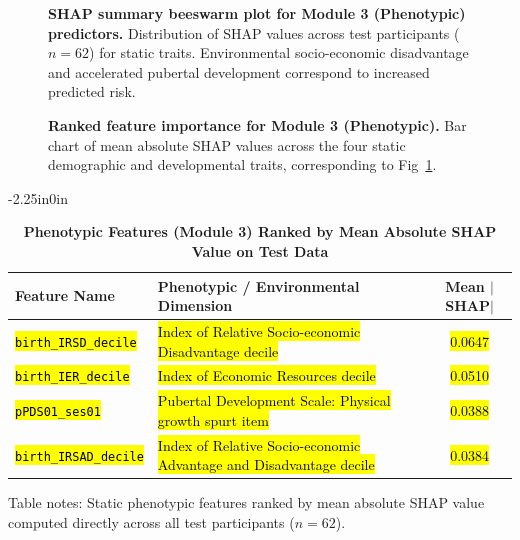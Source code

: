 \documentclass[10pt,letterpaper]{article}
\begin{document}
\begin{figure}[!h]
\caption{\textbf{SHAP summary beeswarm plot for Module 3 (Phenotypic) predictors.}
Distribution of SHAP values across test participants ($n=62$) for static traits. Environmental socio-economic disadvantage and accelerated pubertal development correspond to increased predicted risk.}
\label{fig:module3_shap_summary}
\end{figure}

\begin{figure}[!h]
\caption{\textbf{Ranked feature importance for Module 3 (Phenotypic).}
Bar chart of mean absolute SHAP values across the four static demographic and developmental traits, corresponding to Fig~\ref{fig:module3_shap_summary}.}
\label{fig:module3_bar}
\end{figure}

\begin{table}[!t]
\begin{adjustwidth}{-2.25in}{0in}
\centering
\caption{\textbf{Phenotypic Features (Module 3) Ranked by Mean Absolute SHAP Value on Test Data}}
\label{tab:module3_shap}
\footnotesize
\renewcommand{\arraystretch}{1.2}
\begin{tabular}{|l|l|c|}
\hline
\textbf{Feature Name} & \textbf{Phenotypic / Environmental Dimension} & \textbf{Mean $|$SHAP$|$} \\
\hline
\hl{\texttt{birth\_IRSD\_decile}} & \hl{Index of Relative Socio-economic Disadvantage decile} & \hl{0.0647} \\
\hline
\hl{\texttt{birth\_IER\_decile}} & \hl{Index of Economic Resources decile} & \hl{0.0510} \\
\hline
\hl{\texttt{pPDS01\_ses01}} & \hl{Pubertal Development Scale: Physical growth spurt item} & \hl{0.0388} \\
\hline
\hl{\texttt{birth\_IRSAD\_decile}} & \hl{Index of Relative Socio-economic Advantage and Disadvantage decile} & \hl{0.0384} \\
\hline
\end{tabular}
\begin{flushleft}
Table notes: Static phenotypic features ranked by mean absolute SHAP value computed directly across all test participants ($n=62$).
\end{flushleft}
\end{adjustwidth}
\end{table}
\end{document}
